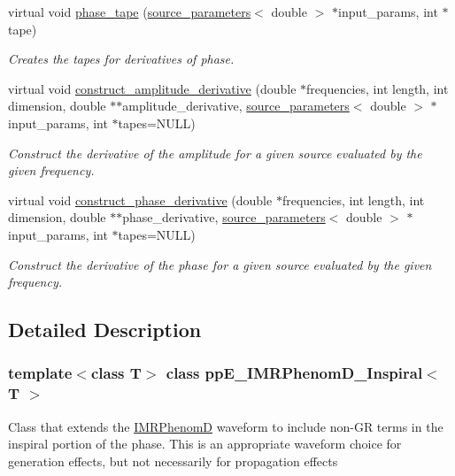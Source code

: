 \begin{DoxyCompactItemize}
virtual void \hyperlink{classppE__IMRPhenomD__Inspiral_a2fb1a8fb66e4204dbe397b792933afbe}{phase\+\_\+tape} (\hyperlink{structsource__parameters}{source\+\_\+parameters}$<$ double $>$ $\ast$input\+\_\+params, int $\ast$tape)
\begin{DoxyCompactList}\small\item\em Creates the tapes for derivatives of phase. \end{DoxyCompactList}\item 
virtual void \hyperlink{classppE__IMRPhenomD__Inspiral_a97d35197595f31d6cfbf6a8cf7c9a9ad}{construct\+\_\+amplitude\+\_\+derivative} (double $\ast$frequencies, int length, int dimension, double $\ast$$\ast$amplitude\+\_\+derivative, \hyperlink{structsource__parameters}{source\+\_\+parameters}$<$ double $>$ $\ast$input\+\_\+params, int $\ast$tapes=N\+U\+LL)
\begin{DoxyCompactList}\small\item\em Construct the derivative of the amplitude for a given source evaluated by the given frequency. \end{DoxyCompactList}\item 
virtual void \hyperlink{classppE__IMRPhenomD__Inspiral_a28d189808db2bd204e0d0051a1ed6427}{construct\+\_\+phase\+\_\+derivative} (double $\ast$frequencies, int length, int dimension, double $\ast$$\ast$phase\+\_\+derivative, \hyperlink{structsource__parameters}{source\+\_\+parameters}$<$ double $>$ $\ast$input\+\_\+params, int $\ast$tapes=N\+U\+LL)
\begin{DoxyCompactList}\small\item\em Construct the derivative of the phase for a given source evaluated by the given frequency. \end{DoxyCompactList}\end{DoxyCompactItemize}


\subsection{Detailed Description}
\subsubsection*{template$<$class T$>$\newline
class pp\+E\+\_\+\+I\+M\+R\+Phenom\+D\+\_\+\+Inspiral$<$ T $>$}

Class that extends the \hyperlink{classIMRPhenomD}{I\+M\+R\+PhenomD} waveform to include non-\/\+GR terms in the inspiral portion of the phase. This is an appropriate waveform choice for generation effects, but not necessarily for propagation effects 


